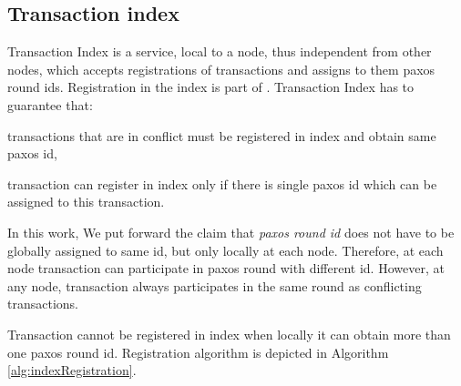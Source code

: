 
\subsection{Transaction index}
\label{sec:mpp:txIndex}
Transaction Index is a service, local to a node, thus independent from other nodes, which accepts registrations of transactions and assigns to them paxos round ids. Registration in the index is part of \mpt.
Transaction Index has to guarantee that: 
\begin{enumerate*}
\item transactions that are in conflict must be registered in index and obtain same paxos id,
\item transaction can register in index only if there is single paxos id which can be assigned to this transaction.
\end{enumerate*}

In this work, We put forward the claim that \emph{paxos round id} does not have to be globally assigned to same id, but only locally at each node. Therefore, at each node transaction can participate in paxos round with different id. However, at any node, transaction always participates in the same round as conflicting transactions.

Transaction cannot be registered in index when locally it can obtain more than one paxos round id. Registration algorithm is depicted in Algorithm \ref{alg:indexRegistration}.

